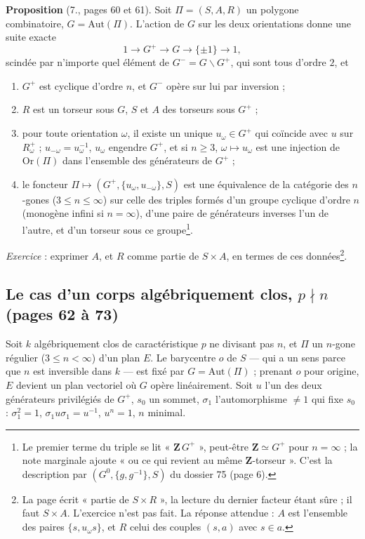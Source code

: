 \documentclass[11pt,a4paper]{article}
\begin{document}
\textbf{Proposition} (7., pages 60 et 61). Soit $\Pi = (S, A, R)$ un polygone
combinatoire, $G = \mathrm{Aut}(\Pi)$. L'action de $G$ sur les deux
orientations donne une suite exacte
\[
  1 \longrightarrow G^{+} \longrightarrow G \longrightarrow \{\pm 1\}
  \longrightarrow 1 ,
\]
scindée par n'importe quel élément de $G^{-} = G \smallsetminus G^{+}$, qui
sont tous d'ordre $2$, et
\begin{enumerate}
  \item[a)] $G^{+}$ est cyclique d'ordre $n$, et $G^{-}$ opère sur lui par
    inversion ;
  \item[b)] $R$ est un torseur sous $G$, $S$ et $A$ des torseurs sous $G^{+}$ ;
  \item[c)] pour toute orientation $\omega$, il existe un unique $u_\omega \in
    G^{+}$ qui coïncide avec $u$ sur $R^{+}_\omega$ ; $u_{-\omega} =
    u_\omega^{-1}$, $u_\omega$ engendre $G^{+}$, et si $n \geq 3$,
    $\omega \mapsto u_\omega$ est une injection de $\mathrm{Or}(\Pi)$ dans
    l'ensemble des générateurs de $G^{+}$ ;
  \item[d)] le foncteur $\Pi \mapsto (G^{+}, \{u_\omega, u_{-\omega}\}, S)$ est
    une équivalence de la catégorie des $n$-gones ($3 \leq n \leq \infty$)
    sur celle des triples formés d'un groupe cyclique d'ordre $n$ (monogène
    infini si $n = \infty$), d'une paire de générateurs inverses l'un de
    l'autre, et d'un torseur sous ce groupe\footnote{Le premier terme du
    triple se lit « $\mathbf{Z}\,G^{+}$ », peut-être $\mathbf{Z} \simeq
    G^{+}$ pour $n = \infty$ ; la note marginale ajoute « ou ce qui revient au
    même $\mathbf{Z}$-torseur ». C'est la description par $(G^0, \{g,
    g^{-1}\}, S)$ du dossier 75 (page 6).}.
\end{enumerate}
\emph{Exercice} : exprimer $A$, et $R$ comme partie de $S \times A$, en termes
de ces données\footnote{La page écrit « partie de $S \times R$ », la lecture
du dernier facteur étant sûre ; il faut $S \times A$. L'exercice n'est pas
fait. La réponse attendue : $A$ est l'ensemble des paires $\{s, u_\omega s\}$,
et $R$ celui des couples $(s, a)$ avec $s \in a$.}.

\subsection*{Le cas d'un corps algébriquement clos, $p \nmid n$ (pages 62 à 73)}

Soit $k$ algébriquement clos de caractéristique $p$ ne divisant pas $n$, et
$\Pi$ un $n$-gone régulier ($3 \leq n < \infty$) d'un plan $E$. Le barycentre
$o$ de $S$ --- qui a un sens parce que $n$ est inversible dans $k$ --- est
fixé par $G = \mathrm{Aut}(\Pi)$ ; prenant $o$ pour origine, $E$ devient un
plan vectoriel où $G$ opère linéairement. Soit $u$ l'un des deux générateurs
privilégiés de $G^{+}$, $s_0$ un sommet, $\sigma_1$ l'automorphisme $\neq 1$
qui fixe $s_0$ : $\sigma_1^2 = 1$, $\sigma_1 u \sigma_1 = u^{-1}$, $u^n = 1$,
$n$ minimal.
\end{document}
